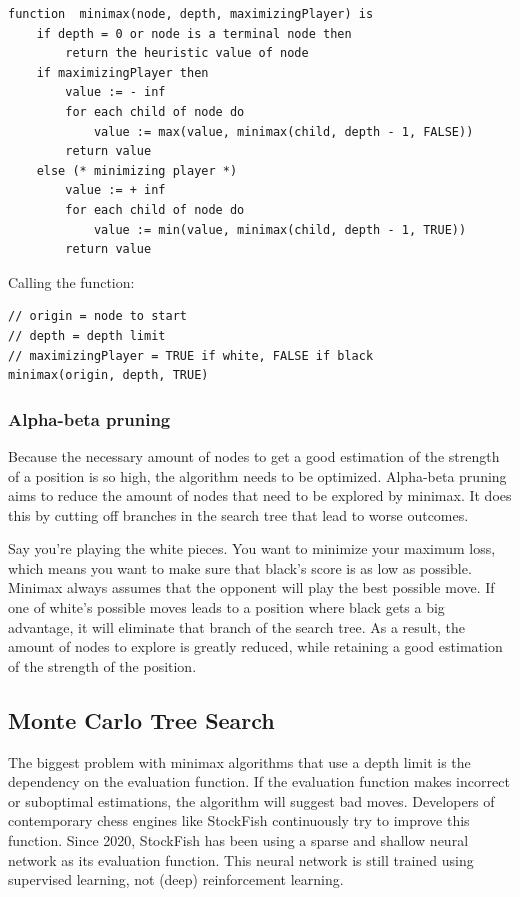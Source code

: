 \documentclass{article}
\begin{document}
\begin{verbatim}
function  minimax(node, depth, maximizingPlayer) is
    if depth = 0 or node is a terminal node then
        return the heuristic value of node
    if maximizingPlayer then
        value := - inf
        for each child of node do
            value := max(value, minimax(child, depth - 1, FALSE))
        return value
    else (* minimizing player *)
        value := + inf
        for each child of node do
            value := min(value, minimax(child, depth - 1, TRUE))
        return value
\end{verbatim}

Calling the function:

\begin{verbatim}
// origin = node to start
// depth = depth limit
// maximizingPlayer = TRUE if white, FALSE if black
minimax(origin, depth, TRUE)
\end{verbatim}

\subsubsection{Alpha-beta pruning}

Because the necessary amount of nodes to get a good estimation of the strength of a position
is so high, the algorithm needs to be optimized. 
Alpha-beta pruning \cite{AlphaBetaPruning2022} aims to reduce the amount of nodes that need to be explored by minimax.
It does this by cutting off branches in the search tree that lead to worse outcomes.

Say you're playing the white pieces. You want to minimize your maximum loss, which means 
you want to make sure that black's score is as low as possible. 
Minimax always assumes that the opponent will play the best possible move. If one of white's possible moves
leads to a position where black gets a big advantage, it will eliminate that branch of the search tree.
As a result, the amount of nodes to explore is greatly reduced, while retaining a good estimation 
of the strength of the position.

\subsection{Monte Carlo Tree Search}

The biggest problem with minimax algorithms that use a depth limit is the dependency on the evaluation function.
If the evaluation function makes incorrect or suboptimal estimations, the algorithm will suggest bad moves. 
Developers of contemporary chess engines like StockFish continuously try to improve this function. 
Since 2020, StockFish has been using a sparse and shallow neural network as its evaluation function. 
This neural network is still trained using supervised learning, not (deep) reinforcement learning.
\end{document}
